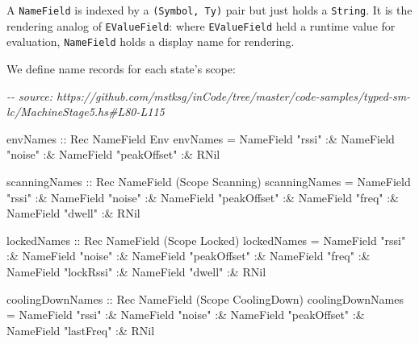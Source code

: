 \documentclass[]{article}
\newenvironment{Shaded}{}{}
\newcommand{\CommentTok}[1]{\textcolor[rgb]{0.38,0.63,0.69}{\textit{#1}}}
\newcommand{\DataTypeTok}[1]{\textcolor[rgb]{0.56,0.13,0.00}{#1}}
\newcommand{\NormalTok}[1]{#1}
\newcommand{\OperatorTok}[1]{\textcolor[rgb]{0.40,0.40,0.40}{#1}}
\newcommand{\OtherTok}[1]{\textcolor[rgb]{0.00,0.44,0.13}{#1}}
\newcommand{\StringTok}[1]{\textcolor[rgb]{0.25,0.44,0.63}{#1}}
\begin{document}
A \texttt{NameField} is indexed by a \texttt{(Symbol,\ Ty)} pair but just holds
a \texttt{String}. It is the rendering analog of \texttt{EValueField}: where
\texttt{EValueField} held a runtime value for evaluation, \texttt{NameField}
holds a display name for rendering.

We define name records for each state's scope:

\begin{Shaded}
\begin{Highlighting}[]
\CommentTok{{-}{-} source: https://github.com/mstksg/inCode/tree/master/code{-}samples/typed{-}sm{-}lc/MachineStage5.hs\#L80{-}L115}

\OtherTok{envNames ::} \DataTypeTok{Rec} \DataTypeTok{NameField} \DataTypeTok{Env}
\NormalTok{envNames }\OtherTok{=}
  \DataTypeTok{NameField} \StringTok{"rssi"}
    \OperatorTok{:\&} \DataTypeTok{NameField} \StringTok{"noise"}
    \OperatorTok{:\&} \DataTypeTok{NameField} \StringTok{"peakOffset"}
    \OperatorTok{:\&} \DataTypeTok{RNil}

\OtherTok{scanningNames ::} \DataTypeTok{Rec} \DataTypeTok{NameField}\NormalTok{ (}\DataTypeTok{Scope} \DataTypeTok{Scanning}\NormalTok{)}
\NormalTok{scanningNames }\OtherTok{=}
  \DataTypeTok{NameField} \StringTok{"rssi"}
    \OperatorTok{:\&} \DataTypeTok{NameField} \StringTok{"noise"}
    \OperatorTok{:\&} \DataTypeTok{NameField} \StringTok{"peakOffset"}
    \OperatorTok{:\&} \DataTypeTok{NameField} \StringTok{"freq"}
    \OperatorTok{:\&} \DataTypeTok{NameField} \StringTok{"dwell"}
    \OperatorTok{:\&} \DataTypeTok{RNil}

\OtherTok{lockedNames ::} \DataTypeTok{Rec} \DataTypeTok{NameField}\NormalTok{ (}\DataTypeTok{Scope} \DataTypeTok{Locked}\NormalTok{)}
\NormalTok{lockedNames }\OtherTok{=}
  \DataTypeTok{NameField} \StringTok{"rssi"}
    \OperatorTok{:\&} \DataTypeTok{NameField} \StringTok{"noise"}
    \OperatorTok{:\&} \DataTypeTok{NameField} \StringTok{"peakOffset"}
    \OperatorTok{:\&} \DataTypeTok{NameField} \StringTok{"freq"}
    \OperatorTok{:\&} \DataTypeTok{NameField} \StringTok{"lockRssi"}
    \OperatorTok{:\&} \DataTypeTok{NameField} \StringTok{"dwell"}
    \OperatorTok{:\&} \DataTypeTok{RNil}

\OtherTok{coolingDownNames ::} \DataTypeTok{Rec} \DataTypeTok{NameField}\NormalTok{ (}\DataTypeTok{Scope} \DataTypeTok{CoolingDown}\NormalTok{)}
\NormalTok{coolingDownNames }\OtherTok{=}
  \DataTypeTok{NameField} \StringTok{"rssi"}
    \OperatorTok{:\&} \DataTypeTok{NameField} \StringTok{"noise"}
    \OperatorTok{:\&} \DataTypeTok{NameField} \StringTok{"peakOffset"}
    \OperatorTok{:\&} \DataTypeTok{NameField} \StringTok{"lastFreq"}
    \OperatorTok{:\&} \DataTypeTok{RNil}
\end{Highlighting}
\end{Shaded}
\end{document}
